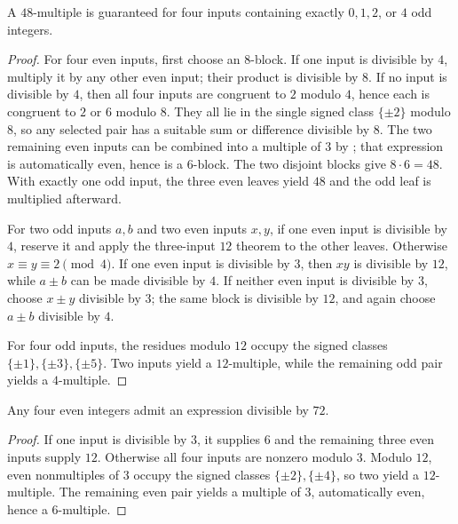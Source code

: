 \begin{theorem}\label{app:four48}
A $48$-multiple is guaranteed for four inputs containing exactly $0,1,2$, or
$4$ odd integers.
\end{theorem}
\begin{proof}
For four even inputs, first choose an $8$-block.  If one input is divisible
by $4$, multiply it by any other even input; their product is divisible by
$8$.  If no input is divisible by $4$, then all four inputs are congruent to
$2$ modulo $4$, hence each is congruent to $2$ or $6$ modulo $8$.  They all
lie in the single signed class $\{\pm2\}$ modulo $8$, so any selected pair
has a suitable sum or difference divisible by $8$.  The two remaining even
inputs can be combined into a multiple of $3$ by ; that
expression is automatically even, hence is a $6$-block.  The two disjoint
blocks give $8\cdot6=48$.  With exactly one odd input, the three even leaves
yield $48$ and the odd leaf is multiplied afterward.

For two odd inputs $a,b$ and two even inputs $x,y$, if one even input is
divisible by $4$, reserve it and apply the three-input $12$ theorem to the
other leaves.  Otherwise $x\equiv y\equiv2\pmod4$.  If one even input is
divisible by $3$, then $xy$ is divisible by $12$, while $a\pm b$ can be
made divisible by $4$.  If neither even input is divisible by $3$, choose
$x\pm y$ divisible by $3$; the same block is divisible by $12$, and again
choose $a\pm b$ divisible by $4$.

For four odd inputs, the residues modulo $12$ occupy the signed classes
$\{\pm1\},\{\pm3\},\{\pm5\}$.  Two inputs yield a $12$-multiple, while
the remaining odd pair yields a $4$-multiple.
\end{proof}

\begin{theorem}\label{app:four72}
Any four even integers admit an expression divisible by $72$.
\end{theorem}
\begin{proof}
If one input is divisible by $3$, it supplies $6$ and the remaining three
even inputs supply $12$.  Otherwise all four inputs are nonzero modulo $3$.
Modulo $12$, even nonmultiples of $3$ occupy the signed classes
$\{\pm2\},\{\pm4\}$, so two yield a $12$-multiple.  The remaining even
pair yields a multiple of $3$, automatically even, hence a $6$-multiple.
\end{proof}

